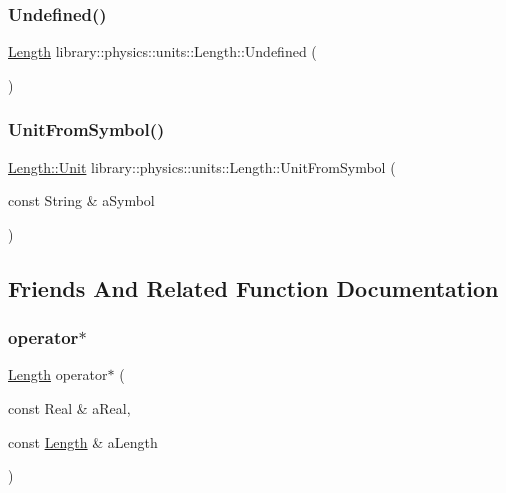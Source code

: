 \subsubsection{\texorpdfstring{Undefined()}{Undefined()}}
{\footnotesize\ttfamily \hyperlink{classlibrary_1_1physics_1_1units_1_1_length}{Length} library\+::physics\+::units\+::\+Length\+::\+Undefined (\begin{DoxyParamCaption}{ }\end{DoxyParamCaption})\hspace{0.3cm}{\ttfamily [static]}}

\mbox{\label{classlibrary_1_1physics_1_1units_1_1_length_af26d05f64f066bea686ed565c41eaf93}} 
\subsubsection{\texorpdfstring{Unit\+From\+Symbol()}{UnitFromSymbol()}}
{\footnotesize\ttfamily \hyperlink{classlibrary_1_1physics_1_1units_1_1_length_a3b8b39cd245cf6b19dc34459baeccb18}{Length\+::\+Unit} library\+::physics\+::units\+::\+Length\+::\+Unit\+From\+Symbol (\begin{DoxyParamCaption}\item[{const String \&}]{a\+Symbol }\end{DoxyParamCaption})\hspace{0.3cm}{\ttfamily [static]}}



\subsection{Friends And Related Function Documentation}
\mbox{\label{classlibrary_1_1physics_1_1units_1_1_length_a72059ec2f1e930a0e75a3a808e434363}} 
\subsubsection{\texorpdfstring{operator$\ast$}{operator*}}
{\footnotesize\ttfamily \hyperlink{classlibrary_1_1physics_1_1units_1_1_length}{Length} operator$\ast$ (\begin{DoxyParamCaption}\item[{const Real \&}]{a\+Real,  }\item[{const \hyperlink{classlibrary_1_1physics_1_1units_1_1_length}{Length} \&}]{a\+Length }\end{DoxyParamCaption})\hspace{0.3cm}{\ttfamily [friend]}}

